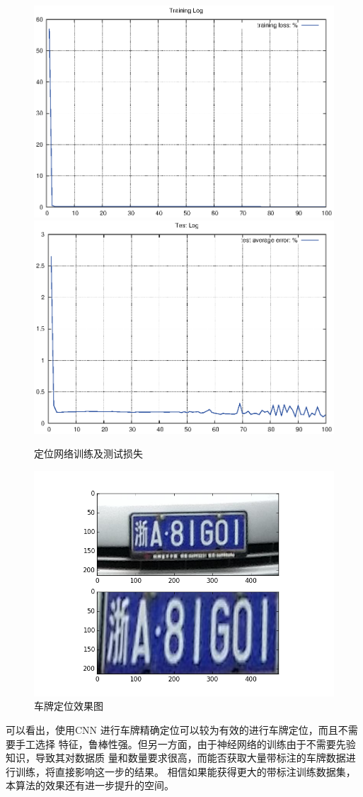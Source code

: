 \begin{figure}[ht]
\centering
{}
{\includegraphics[width=0.45\linewidth]{./Figure/LocalizationTrainLog.eps}}
{\includegraphics[width=0.45\linewidth]{./Figure/LocalizationTestLog.eps}}
\caption{定位网络训练及测试损失}\label{Fig:LocalizationLogs}
\end{figure}

\begin{figure}[ht]
\centering
\includegraphics[height=0.4\textheight, keepaspectratio]{./Figure/LocalizationDemo.png}
\caption{车牌定位效果图}\label{Fig:LocalizationDemo}
\end{figure}

可以看出，使用CNN 进行车牌精确定位可以较为有效的进行车牌定位，而且不需要手工选择
特征，鲁棒性强。但另一方面，由于神经网络的训练由于不需要先验知识，导致其对数据质
量和数量要求很高，而能否获取大量带标注的车牌数据进行训练，将直接影响这一步的结果。
相信如果能获得更大的带标注训练数据集，本算法的效果还有进一步提升的空间。

